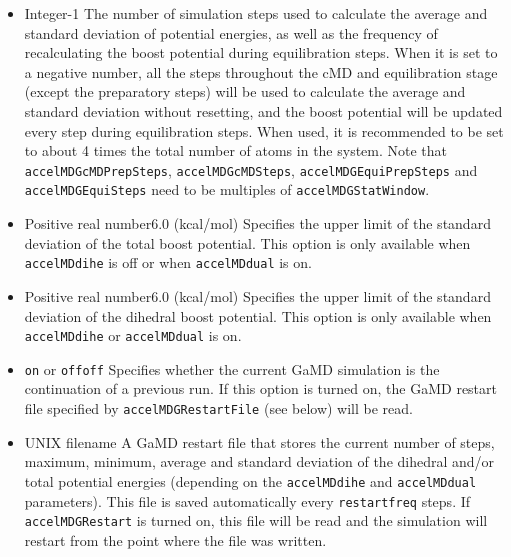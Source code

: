 \begin{itemize}
\item
{}
{Integer}{-1}
{The number of simulation steps used to calculate the average and standard deviation of potential energies, as well as the frequency of recalculating the boost potential during equilibration steps. When it is set to a negative number, all the steps throughout the cMD and equilibration stage (except the preparatory steps) will be used to calculate the average and standard deviation without resetting, and the boost potential will be updated every step during equilibration steps. When used, it is recommended to be set to about 4 times the total number of atoms in the system. Note that {\tt accelMDGcMDPrepSteps}, {\tt accelMDGcMDSteps}, {\tt accelMDGEquiPrepSteps} and {\tt accelMDGEquiSteps} need to be multiples of {\tt accelMDGStatWindow}.
}

\item
{}
{Positive real number}{6.0 (kcal/mol)}
{Specifies the upper limit of the standard deviation of the total boost potential. This option is only available when {\tt accelMDdihe} is off or when {\tt accelMDdual} is on.
}

\item
{}
{Positive real number}{6.0 (kcal/mol)}
{Specifies the upper limit of the standard deviation of the dihedral boost potential. This option is only available when {\tt accelMDdihe} or {\tt accelMDdual} is on.
}

\item
{}
{{\tt on} or {\tt off}}{{\tt off}}
{Specifies whether the current GaMD simulation is the continuation of a previous run. If this option is turned on, the GaMD restart file specified by {\tt accelMDGRestartFile} (see below) will be read. 
}

\item
{}
{UNIX filename}
{A GaMD restart file that stores the current number of steps, maximum, minimum, average and standard deviation of the dihedral and/or total potential energies (depending on the {\tt accelMDdihe} and {\tt accelMDdual} parameters). This file is saved automatically every {\tt restartfreq} steps. If {\tt accelMDGRestart} is turned on, this file will be read and the simulation will restart from the point where the file was written.
}

\end{itemize}


